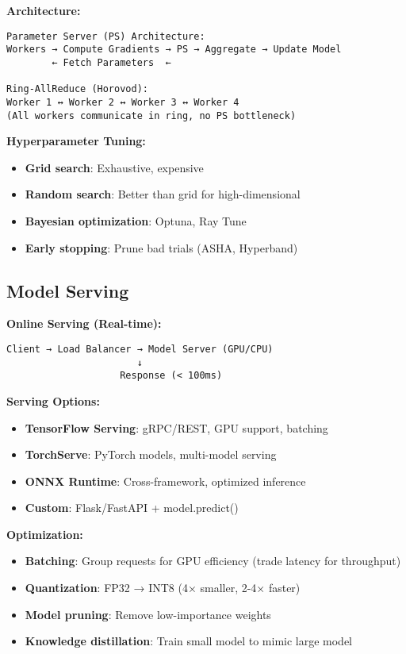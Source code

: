 \documentclass[8pt,landscape]{article}
\begin{document}
\begin{multicols}{3}
\textbf{Architecture:}
\begin{verbatim}
Parameter Server (PS) Architecture:
Workers → Compute Gradients → PS → Aggregate → Update Model
        ← Fetch Parameters  ←

Ring-AllReduce (Horovod):
Worker 1 ↔ Worker 2 ↔ Worker 3 ↔ Worker 4
(All workers communicate in ring, no PS bottleneck)
\end{verbatim}

\textbf{Hyperparameter Tuning:}
\begin{itemize}
\item \textbf{Grid search}: Exhaustive, expensive
\item \textbf{Random search}: Better than grid for high-dimensional
\item \textbf{Bayesian optimization}: Optuna, Ray Tune
\item \textbf{Early stopping}: Prune bad trials (ASHA, Hyperband)
\end{itemize}

\subsection*{Model Serving}

\textbf{Online Serving (Real-time):}
\begin{verbatim}
Client → Load Balancer → Model Server (GPU/CPU)
                       ↓
                    Response (< 100ms)
\end{verbatim}

\textbf{Serving Options:}
\begin{itemize}
\item \textbf{TensorFlow Serving}: gRPC/REST, GPU support, batching
\item \textbf{TorchServe}: PyTorch models, multi-model serving
\item \textbf{ONNX Runtime}: Cross-framework, optimized inference
\item \textbf{Custom}: Flask/FastAPI + model.predict()
\end{itemize}

\textbf{Optimization:}
\begin{itemize}
\item \textbf{Batching}: Group requests for GPU efficiency (trade latency for throughput)
\item \textbf{Quantization}: FP32 → INT8 (4× smaller, 2-4× faster)
\item \textbf{Model pruning}: Remove low-importance weights
\item \textbf{Knowledge distillation}: Train small model to mimic large model
\end{itemize}


\end{multicols}
\end{document}
